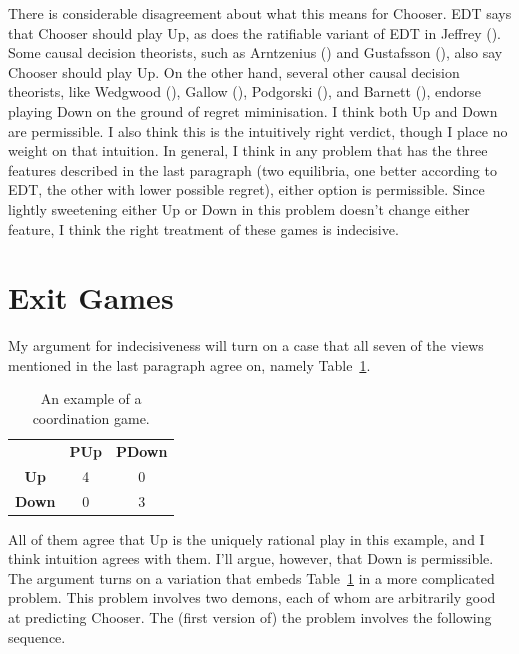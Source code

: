 \documentclass[
  12pt,
  letterpaper,
  DIV=11,
  numbers=noendperiod]{scrreprt}
\begin{document}
There is considerable disagreement about what this means for Chooser.
EDT says that Chooser should play Up, as does the ratifiable variant of
EDT in Jeffrey (). Some causal decision
theorists, such as Arntzenius () and
Gustafsson (), also say Chooser
should play Up. On the other hand, several other causal decision
theorists, like Wedgwood (), Gallow
(), Podgorski
(), and Barnett
(), endorse playing Down on the ground
of regret miminisation. I think both Up and Down are permissible. I also
think this is the intuitively right verdict, though I place no weight on
that intuition. In general, I think in any problem that has the three
features described in the last paragraph (two equilibria, one better
according to EDT, the other with lower possible regret), either option
is permissible. Since lightly sweetening either Up or Down in this
problem doesn't change either feature, I think the right treatment of
these games is indecisive.

\section{Exit Games}\label{sec-exit-games}

My argument for indecisiveness will turn on a case that all seven of the
views mentioned in the last paragraph agree on, namely
Table~\ref{tbl-coord}.

\begin{longtable}[]{@{}ccc@{}}
\caption{An example of a coordination
game.}\label{tbl-coord}\tabularnewline
\toprule\noalign{}
\endfirsthead
\endhead
\bottomrule\noalign{}
\endlastfoot
& \textbf{PUp} & \textbf{PDown} \\
\textbf{Up} & 4 & 0 \\
\textbf{Down} & 0 & 3 \\
\end{longtable}

All of them agree that Up is the uniquely rational play in this example,
and I think intuition agrees with them. I'll argue, however, that Down
is permissible. The argument turns on a variation that embeds
Table~\ref{tbl-coord} in a more complicated problem. This problem
involves two demons, each of whom are arbitrarily good at predicting
Chooser. The (first version of) the problem involves the following
sequence.
\end{document}
